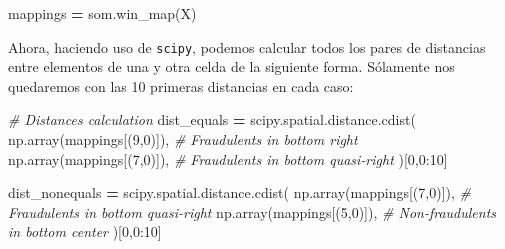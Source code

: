 \documentclass[
  a4paper,
,tablecaptionabove
]{scrartcl}
\newenvironment{Shaded}{\begin{snugshade}}{\end{snugshade}}
\newcommand{\CommentTok}[1]{\textcolor[rgb]{0.56,0.35,0.01}{\textit{#1}}}
\newcommand{\DecValTok}[1]{\textcolor[rgb]{0.00,0.00,0.81}{#1}}
\newcommand{\NormalTok}[1]{#1}
\newcommand{\OperatorTok}[1]{\textcolor[rgb]{0.81,0.36,0.00}{\textbf{#1}}}
\begin{document}
\begin{Shaded}
\begin{Highlighting}[]
\NormalTok{mappings }\OperatorTok{=}\NormalTok{ som.win_map(X)}
\end{Highlighting}
\end{Shaded}

Ahora, haciendo uso de \texttt{scipy}, podemos calcular todos los pares
de distancias entre elementos de una y otra celda de la siguiente forma.
Sólamente nos quedaremos con las 10 primeras distancias en cada caso:

\begin{Shaded}
\begin{Highlighting}[]
\CommentTok{# Distances calculation}
\NormalTok{dist_equals }\OperatorTok{=}\NormalTok{ scipy.spatial.distance.cdist(}
\NormalTok{    np.array(mappings[(}\DecValTok{9}\NormalTok{,}\DecValTok{0}\NormalTok{)]), }\CommentTok{# Fraudulents in bottom right}
\NormalTok{    np.array(mappings[(}\DecValTok{7}\NormalTok{,}\DecValTok{0}\NormalTok{)]), }\CommentTok{# Fraudulents in bottom quasi-right}
\NormalTok{)[}\DecValTok{0}\NormalTok{,}\DecValTok{0}\NormalTok{:}\DecValTok{10}\NormalTok{]}

\NormalTok{dist_nonequals }\OperatorTok{=}\NormalTok{ scipy.spatial.distance.cdist(}
\NormalTok{    np.array(mappings[(}\DecValTok{7}\NormalTok{,}\DecValTok{0}\NormalTok{)]), }\CommentTok{# Fraudulents in bottom quasi-right}
\NormalTok{    np.array(mappings[(}\DecValTok{5}\NormalTok{,}\DecValTok{0}\NormalTok{)]), }\CommentTok{# Non-fraudulents in bottom center}
\NormalTok{)[}\DecValTok{0}\NormalTok{,}\DecValTok{0}\NormalTok{:}\DecValTok{10}\NormalTok{]}
\end{Highlighting}
\end{Shaded}

\begin{table}[H]

\caption{\label{tab:unnamed-chunk-11}Distancias entre instancias cercanas en el mapa (fraudulentos en el (9,0) y en el (7,0))}
\centering
{}
\end{table}

\begin{table}[H]

\caption{\label{tab:unnamed-chunk-11}Distancias entre instancias más alejadas en el mapa (fraudulentos en el (7,0) y no fraudulentos en el (5,0))}
\centering
{}
\end{table}
\end{document}

